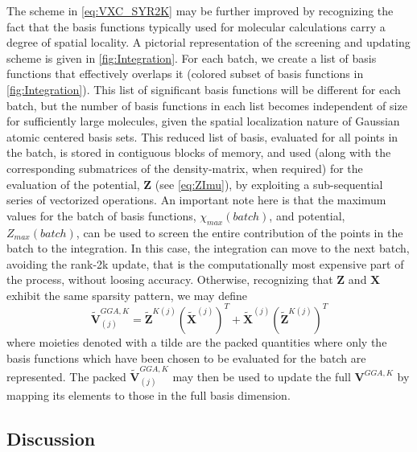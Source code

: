 The scheme in \cref{eq:VXC_SYR2K} may be further improved by recognizing the fact  that the basis functions typically used for molecular calculations carry 
a degree of spatial locality. 
A pictorial representation of the screening and updating scheme is given in \cref{fig:Integration}.
For each batch, we create a list of basis functions
that effectively overlaps it (colored subset of basis functions in \cref{fig:Integration}). 
This list of significant basis functions will be different for
each batch, but the number of basis
functions in each list becomes independent of size
for sufficiently large molecules, given the  spatial localization nature of Gaussian atomic centered basis sets.
This reduced list of basis, evaluated for all points in the batch, is stored in contiguous blocks of memory, and used (along with the corresponding submatrices of the density-matrix, when required) for the evaluation of the potential, $\mathbf{Z}$ (see \cref{eq:ZImu}), by exploiting a sub-sequential series of vectorized operations.
An important note here is that the maximum values for the batch of basis functions, $\chi_{max}(batch)$, and potential, $Z_{max}(batch)$, can be used to screen the entire contribution of the points in the batch to the integration. In this case, the integration can move to the next batch, avoiding the rank-2k update, that is the computationally most expensive part of the process,  without loosing accuracy.
Otherwise, recognizing that $\mathbf{Z}$ and $\mathbf{X}$ exhibit the same sparsity pattern, we may define
\begin{equation}
\tilde{\mathbf{V}}_{(j)}^{GGA,K} = \tilde{\mathbf{Z}}^{K(j)} \left(\tilde{\mathbf{X}}^{(j)}\right)^T + 
\tilde{\mathbf{X}}^{(j)} \left(\tilde{\mathbf{Z}}^{K(j)}\right)^T
\end{equation}
where moieties denoted with a tilde are the packed quantities where only the basis functions which have been chosen to be evaluated for the batch are represented.
The packed $\tilde{\mathbf{V}}_{(j)}^{GGA,K}$ may then be used to update the full $\mathbf{V}^{GGA,K}$ by mapping its elements to those in the full basis dimension.

\subsection{Discussion}

